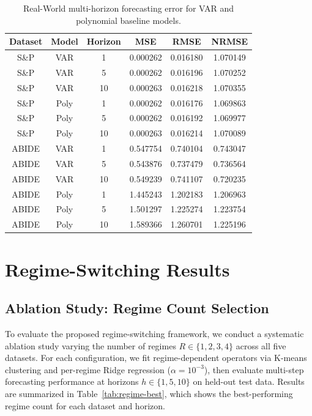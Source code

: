 \documentclass[journal, onecolumn]{IEEEtran}
\begin{document}
\begin{table}[h!]
\centering
\caption{Real-World multi-horizon forecasting error for VAR and polynomial baseline models.}
\label{tab:baseline-results-rw}
\begin{tabular}{cccccc}
\toprule
Dataset & Model & Horizon & MSE & RMSE & NRMSE \\
\midrule
S\&P & VAR & 1  & 0.000262 & 0.016180 & 1.070149 \\
S\&P & VAR & 5  & 0.000262 & 0.016196 & 1.070252 \\
S\&P & VAR & 10 & 0.000263 & 0.016218 & 1.070355 \\
S\&P & Poly & 1  & 0.000262 & 0.016176 & 1.069863 \\
S\&P & Poly & 5  & 0.000262 & 0.016192 & 1.069977 \\
S\&P & Poly & 10 & 0.000263 & 0.016214 & 1.070089 \\
\midrule
ABIDE & VAR & 1  & 0.547754 & 0.740104 & 0.743047 \\
ABIDE & VAR & 5  & 0.543876 & 0.737479 & 0.736564 \\
ABIDE & VAR & 10 & 0.549239 & 0.741107 & 0.720235 \\
ABIDE & Poly & 1  & 1.445243 & 1.202183 & 1.206963 \\
ABIDE & Poly & 5  & 1.501297 & 1.225274 & 1.223754 \\
ABIDE & Poly & 10 & 1.589366 & 1.260701 & 1.225196 \\
\bottomrule
\end{tabular}
\end{table}

\section{Regime-Switching Results}
\label{sec:regime-results}

\subsection{Ablation Study: Regime Count Selection}

To evaluate the proposed regime-switching framework, we conduct a systematic ablation study varying the number of regimes $R \in \{1, 2, 3, 4\}$ across all five datasets. For each configuration, we fit regime-dependent operators via K-means clustering and per-regime Ridge regression ($\alpha = 10^{-3}$), then evaluate multi-step forecasting performance at horizons $h \in \{1, 5, 10\}$ on held-out test data. Results are summarized in Table~\ref{tab:regime-best}, which shows the best-performing regime count for each dataset and horizon.
\end{document}
